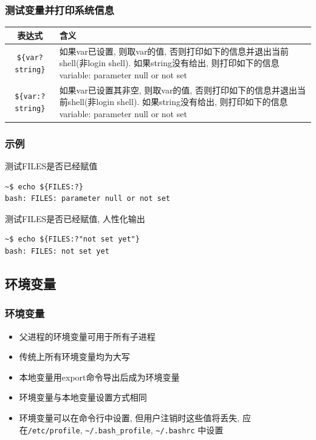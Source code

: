 \documentclass[compress]{beamer}
\begin{document}
\begin{frame}[fragile]
\frametitle{测试变量并打印系统信息}
{\small
\begin{tabular}{|c|p{7cm}|} \hline
表达式 & 含义 \\ \hline \hline

\verb=${var?string}= & 如果var已设置, 则取var的值,
否则打印如下的信息并退出当前shell(非login shell).
如果string没有给出, 则打印如下的信息
  variable:       parameter null or not set
\\ \hline

\verb=${var:?string}= & 如果var已设置其非空, 则取var的值,
否则打印如下的信息并退出当前shell(非login shell).
如果string没有给出, 则打印如下的信息
  variable:       parameter null or not set
\\ \hline

\end{tabular}
}


\end{frame}

\begin{frame}[fragile]
  \frametitle{示例}

\begin{block} {测试FILES是否已经赋值}
\begin{Verbatim}
~$ echo ${FILES:?}
bash: FILES: parameter null or not set
\end{Verbatim}
\end{block}

\begin{block}{测试FILES是否已经赋值, 人性化输出}
\begin{Verbatim}
~$ echo ${FILES:?"not set yet"}
bash: FILES: not set yet
\end{Verbatim}
\end{block}

\end{frame}

\subsection{环境变量}

\begin{frame}[fragile]
\frametitle{环境变量}

\begin{itemize}
\item 父进程的环境变量可用于所有子进程
\item 传统上所有环境变量均为大写
\item 本地变量用\alert{export}命令导出后成为环境变量
\item 环境变量与本地变量设置方式相同
\item 环境变量可以在命令行中设置, 但用户注销时这些值将丢失, 应在\verb=/etc/profile=, \verb=~/.bash_profile=,
\verb=~/.bashrc= 中设置
\end{itemize}

\end{frame}
\end{document}
